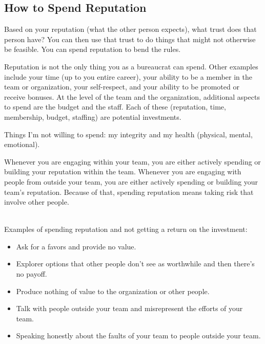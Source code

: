 \subsection*{How to Spend Reputation}

Based on your reputation (what the other person expects), what trust does that person have?  You can then use that trust to do things that might not otherwise be feasible. You can spend reputation to bend the rules. 

Reputation is not the only thing you as a bureaucrat can spend. Other examples include your time (up to you entire career), your ability to be a member in the team or organization, your self-respect, and your ability to be promoted or receive bonuses. At the level of the team and the organization, additional aspects to spend are the budget and the staff. Each of these (reputation, time, membership, budget, staffing) are potential investments. 

Things I'm not willing to spend: my integrity and my health (physical, mental, emotional).


Whenever you are engaging within your team, you are either actively spending or building your reputation within the team.
Whenever you are engaging with people from outside your team, you are either actively spending or building your team's reputation.
Because of that, spending reputation means taking risk that involve other people.

\ \\

Examples of spending reputation and not getting a return on the investment:
\begin{itemize}
    \item Ask for a favors and provide no value.
    \item Explorer options that other people don't see as worthwhile and then there's no payoff.
    \item Produce nothing of value to the organization or other people.
    \item Talk with people outside your team and misrepresent the efforts of your team.
    \item Speaking honestly about the faults of your team to people outside your team.
\end{itemize}












